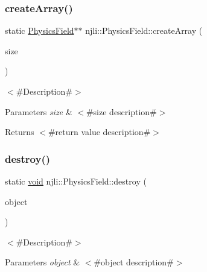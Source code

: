 \subsubsection{\texorpdfstring{create\+Array()}{createArray()}}
{\footnotesize\ttfamily static \mbox{\hyperlink{classnjli_1_1_physics_field}{Physics\+Field}}$\ast$$\ast$ njli\+::\+Physics\+Field\+::create\+Array (\begin{DoxyParamCaption}\item[{const \mbox{\hyperlink{_util_8h_a10e94b422ef0c20dcdec20d31a1f5049}{u32}}}]{size }\end{DoxyParamCaption})\hspace{0.3cm}{\ttfamily [static]}}

$<$\#\+Description\#$>$


\begin{DoxyParams}{Parameters}
{\em size} & $<$\#size description\#$>$\\
\hline
\end{DoxyParams}
\begin{DoxyReturn}{Returns}
$<$\#return value description\#$>$ 
\end{DoxyReturn}
\mbox{\label{classnjli_1_1_physics_field_ae7e7079ad19483fb8add9e33af27e913}} 
\subsubsection{\texorpdfstring{destroy()}{destroy()}}
{\footnotesize\ttfamily static \mbox{\hyperlink{_thread_8h_af1e856da2e658414cb2456cb6f7ebc66}{void}} njli\+::\+Physics\+Field\+::destroy (\begin{DoxyParamCaption}\item[{\mbox{\hyperlink{classnjli_1_1_physics_field}{Physics\+Field}} $\ast$}]{object }\end{DoxyParamCaption})\hspace{0.3cm}{\ttfamily [static]}}

$<$\#\+Description\#$>$


\begin{DoxyParams}{Parameters}
{\em object} & $<$\#object description\#$>$ \\
\hline
\end{DoxyParams}
\mbox{\label{classnjli_1_1_physics_field_a8190a354cc130035426f76c9d815e643}} 
